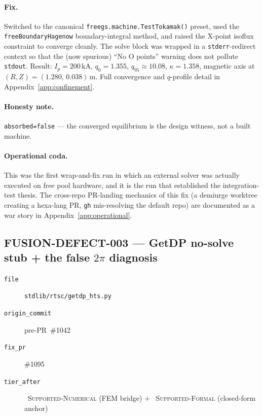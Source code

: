 \paragraph{Fix.}
Switched to the canonical \verb|freegs.machine.TestTokamak()| preset,
used the \verb|freeBoundaryHagenow| boundary-integral method, and raised
the X-point isoflux constraint to converge cleanly. The solve block was
wrapped in a \texttt{stderr}-redirect context so that the (now spurious)
``No O points'' warning does not pollute \texttt{stdout}. Result:
$I_p = 200$\,kA, $q_0 = 1.355$, $q_{95}\approx 10.08$,
$\kappa = 1.358$, magnetic axis at $(R, Z) = (1.280,\,0.038)$\,m. Full
convergence and $q$-profile detail in Appendix~\ref{app:confinement}.

\paragraph{Honesty note.}
\texttt{absorbed=false} --- the converged equilibrium is the design
witness, not a built machine.

\paragraph{Operational coda.}
This was the first wrap-and-fix run in which an external solver was
actually executed on free pool hardware, and it is the run that
established the integration-test thesis. The cross-repo PR-landing
mechanics of this fix (a demiurge worktree creating a hexa-lang PR,
\texttt{gh} mis-resolving the default repo) are documented as a war
story in Appendix~\ref{app:operational}.

\subsection{FUSION-DEFECT-003 --- GetDP no-solve stub + the false $2\pi$ diagnosis}
\label{app:adapters:getdp}

\begin{description}
  \item[\texttt{file}] \texttt{stdlib/rtsc/getdp\_hts.py}
  \item[\texttt{origin\_commit}] pre-PR~\#1042
  \item[\texttt{fix\_pr}] \#1095
  \item[\texttt{tier\_after}] \tierGreen\ \textsc{Supported-Numerical}
        (FEM bridge) $+$ \tierBlue\ \textsc{Supported-Formal} (closed-form
        anchor)
\end{description}

